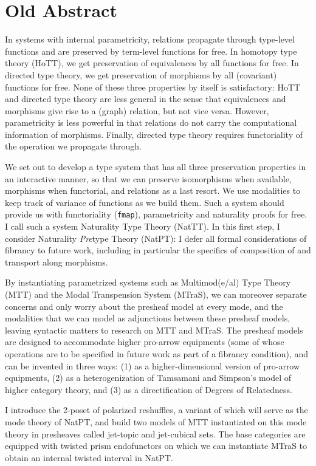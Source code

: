 \documentclass[twoLevelNum]{higherStructures} %
\begin{document}
\section{Old Abstract}
In systems with internal parametricity,
relations propagate through type-level functions and are preserved by term-level functions for free.
In homotopy type theory (HoTT), we get preservation of equivalences by all functions for free.
In directed type theory, we get preservation of morphisms by all (covariant) functions for free.
None of these three properties by itself is satisfactory:
HoTT and directed type theory are less general in the sense that equivalences and morphisms give rise to a (graph) relation, but not vice versa.
However, parametricity is less powerful in that relations do not carry the computational information of morphisms.
Finally, directed type theory requires functoriality of the operation we propagate through.

We set out to develop a type system that has all three preservation properties in an interactive manner, so that we can preserve isomorphisms when available, morphisms when functorial, and relations as a last resort.
We use modalities to keep track of variance of functions as we build them.
Such a system should provide us with functoriality (\texttt{fmap}), parametricity and naturality proofs for free. I call such a system Naturality Type Theory (NatTT).
In this first step, I consider Naturality \emph{Pre}type Theory (NatPT):
I defer all formal considerations of fibrancy to future work,
including in particular the specifics of composition of and transport along morphisms.

By instantiating parametrized systems such as Multimod(e/al) Type Theory (MTT) and the Modal Transpension System (MTraS), we can moreover separate concerns and only worry about the presheaf model at every mode, and the modalities that we can model as adjunctions between these presheaf models, leaving syntactic matters to research on MTT and MTraS.
The presheaf models are designed to accommodate higher pro-arrow equipments (some of whose operations are to be specified in future work as part of a fibrancy condition), and can be invented in three ways: (1) as a higher-dimensional version of pro-arrow equipments, (2) as a heterogenization of Tamsamani and Simpson's model of higher category theory, and (3) as a directification of Degrees of Relatedness.

I introduce the 2-poset of polarized reshuffles, a variant of which will serve as the mode theory of NatPT, and build two models of MTT instantiated on this mode theory in presheaves called jet-topic and jet-cubical sets.
The base categories are equipped with twisted prism endofunctors on which we can instantiate MTraS to obtain an internal twisted interval in NatPT.
\end{document}
